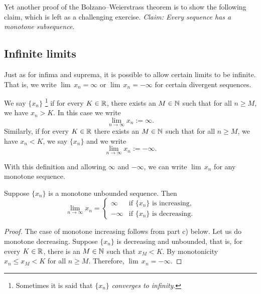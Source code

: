 Yet another proof of the Bolzano--Weierstrass theorem is to show the
following claim,
which is left as a challenging exercise.
\emph{Claim: Every sequence has a monotone subsequence}.

\subsection{Infinite limits}

Just as for infima and suprema, it is possible to allow certain
limits to be infinite.  That is, we write $\lim \, x_n = \infty$ or
$\lim \, x_n = -\infty$ for certain divergent sequences.

\begin{defn}
We say
$\{ x_n \}$ \emph{}%
\footnote{Sometimes it is said that $\{ x_n \}$ \emph{converges to infinity}.}
if for every $K \in
{\mathbb{R}}$, there exists an $M \in {\mathbb{N}}$ such that for all $n \geq M$, we have $x_n >
K$.  In this case we write
\begin{equation*}
\lim_{n \to \infty} x_n := \infty .  
\end{equation*}
Similarly,
if for every $K \in {\mathbb{R}}$ there exists an $M \in {\mathbb{N}}$ such that
for all $n \geq M$, we have $x_n < K$, we say $\{ x_n \}$
\emph{} and we write
\begin{equation*}
\lim_{n \to \infty} x_n := -\infty .  
\end{equation*}
\end{defn}

With this definition and allowing $\infty$ and $-\infty$,
we can write $\lim \, x_n$ for any monotone sequence.

\begin{prop} \label{prop:unboundedmonotone}
Suppose $\{ x_n \}$ is a monotone unbounded sequence.  Then
\begin{equation*}
\lim_{n \to \infty} x_n =
\begin{cases}
\infty  & \text{if } \{ x_n \} \text{ is increasing,} \\
-\infty & \text{if } \{ x_n \} \text{ is decreasing.}
\end{cases}
\end{equation*}
\end{prop}

\begin{proof}
The case of monotone increasing follows from
 part c) below.  Let us do
monotone decreasing.  Suppose $\{x_n\}$ is decreasing and unbounded,
that is,
for every $K \in {\mathbb{R}}$, there is an $M \in {\mathbb{N}}$ such that $x_M < K$.
By monotonicity $x_n \leq x_M < K$ for all $n \geq M$.   Therefore,
$\lim \, x_n = -\infty$.
\end{proof}

